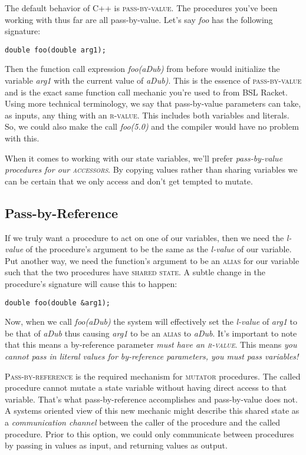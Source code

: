 \documentclass[]{tufte-handout}
\begin{document}
The default behavior of C++ is \textsc{pass-by-value}. The procedures you've been working with thus far are all pass-by-value. Let's say \textit{foo} has the following signature:
\begin{verbatim}
double foo(double arg1);
\end{verbatim} 
Then the function call expression \textit{foo(aDub)} from before would initialize the variable \textit{arg1} with the current value of \textit{aDub)}. This is the essence of \textsc{pass-by-value} and is the exact same function call mechanic you're used to from BSL Racket. Using more technical terminology, we say that pass-by-value parameters can take, as inputs, any thing with an \textsc{r-value}. This includes both variables and literals. So, we could also make the call \textit{foo(5.0)} and the compiler would have no problem with this. 

When it comes to working with our state variables, we'll prefer \textit{pass-by-value procedures for our \textsc{accessors}}.  By copying values rather than sharing variables we can be certain that we only access and don't get tempted to mutate.   

\subsection{Pass-by-Reference}

If we truly want a procedure to act on one of our variables, then we need the \textit{l-value} of the procedure's argument to be the same as the \textit{l-value} of our variable.  Put another way, we need the function's argument to be an \textsc{alias} for our variable such that the two procedures have \textsc{shared state}.  A subtle change in the procedure's signature will cause this to happen:
\begin{verbatim}
double foo(double &arg1);
\end{verbatim}
Now, when we call \textit{foo(aDub)} the system will effectively set the \textit{l-value} of \textit{arg1} to be that of \textit{aDub} thus causing \textit{arg1} to be an \textsc{alias} to \textit{aDub}. It's important to note that this means a by-reference parameter \textit{must have an \textsc{r-value}}. This means \textit{you cannot pass in literal values for by-reference parameters, you must pass variables!}

\textsc{Pass-by-reference} is the required mechanism for \textsc{mutator} procedures. The called procedure cannot mutate a state variable without having direct access to that variable. That's what pass-by-reference accomplishes and pass-by-value does not. A systems oriented view of this new mechanic might describe this shared state as a \textit{communication channel} between the caller of the procedure and the called procedure. Prior to this option, we could only communicate between procedures by passing in values as input, and returning values as output. 
\end{document}
